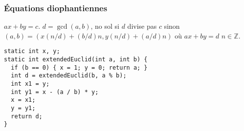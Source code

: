 \subsubsection{Équations diophantiennes}
$ax + by = c$. $d = \gcd(a,b)$, no sol si $d$ divise pas $c$ sinon $(a,b) = (x (n/d) + (b/d)n, y (n/d) + (a/d)n)$ où $ax + by = d$ $n \in \mathbb{Z}$.
\begin{lstlisting}
static int x, y;
static int extendedEuclid(int a, int b) {
  if (b == 0) { x = 1; y = 0; return a; }
  int d = extendedEuclid(b, a % b);
  int x1 = y;
  int y1 = x - (a / b) * y;
  x = x1;
  y = y1;
  return d;
}
\end{lstlisting}
